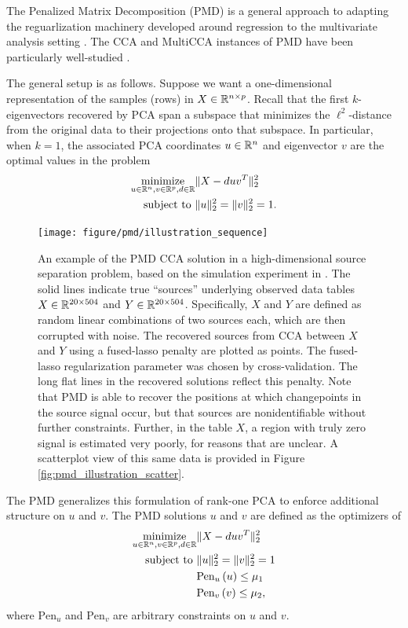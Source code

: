 \documentclass{article}
\begin{document}
The Penalized Matrix Decomposition (PMD) is a general approach to adapting the
reguarlization machinery developed around regression to the multivariate
analysis setting \citep{witten2009penalized}. The CCA and MultiCCA instances of
PMD have been particularly well-studied \citep{witten2009penalized,
  witten2013package}.

The general setup is as follows. Suppose we want a one-dimensional
representation of the samples (rows) in $X \in \mathbb{R}^{n \times p}$. Recall that
the first $k$-eigenvectors recovered by PCA span a subspace that minimizes the
$\ell^{2}$-distance from the original data to their projections onto that
subspace. In particular, when $k = 1$, the associated PCA coordinates $u \in
\mathbb{R}^{n}$ and eigenvector $v$ are the optimal values in the problem
\begin{align*}
  \mathop\mathrm{minimize}_{u \in \mathbb{R}^{n}, v \in \mathbb{R}^{p}, d \in \mathbb{R}} &\|X - duv^{T}\|_{2}^{2} \\
  \text{subject to } &\|u\|_{2}^{2} = \|v\|_{2}^{2} = 1.
\end{align*}

\begin{figure}
  \centering
  \texttt{[image: figure/pmd/illustration\_sequence]}
  \caption{An example of the PMD CCA solution in a high-dimensional source
    separation problem, based on the simulation experiment in
    \citep{witten2009penalized}. The solid lines indicate true ``sources''
    underlying observed data tables $X \in \mathbb{R}^{20 \times 504}$ and $Y \in
    \mathbb{R}^{20 \times 504}$. Specifically, $X$ and $Y$ are defined as random
    linear combinations of two sources each, which are then corrupted with
    noise. The recovered sources from CCA between $X$ and $Y$ using a
    fused-lasso penalty are plotted as points. The fused-lasso regularization
    parameter was chosen by cross-validation. The long flat lines in the
    recovered solutions reflect this penalty. Note that PMD is able to recover
    the positions at which changepoints in the source signal occur, but that
    sources are nonidentifiable without further constraints. Further, in the
    table $X$, a region with truly zero signal is estimated very poorly, for
    reasons that are unclear. A scatterplot view of this same data is provided
    in Figure
    \ref{fig:pmd_illustration_scatter}. \label{fig:pmd_illustration_sequence}}
\end{figure}

The PMD generalizes this formulation of rank-one PCA to enforce additional
structure on $u$ and $v$. The PMD solutions $u$ and $v$ are defined as the
optimizers of
\begin{align}
\label{eq:pmd_opt} \mathop\mathrm{minimize}_{u \in \mathbb{R}^{n}, v \in \mathbb{R}^{p}, d
  \in \mathbb{R}} &\|X - duv^{T}\|_{2}^{2} \\
  \text{subject to } &\|u\|_{2}^{2} = \|v\|_{2}^{2} = 1 \nonumber \\
  & \text{Pen}_{u}\left(u\right) \leq \mu_{1} \nonumber \\
  & \text{Pen}_{v}\left(v\right) \leq \mu_{2}, \nonumber
\end{align}
where $\text{Pen}_u$ and $\text{Pen}_v$ are arbitrary constraints on $u$ and
$v$.
\end{document}
